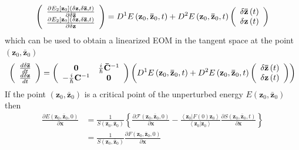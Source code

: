 \documentclass[aps,preprint]{revtex4}%
\begin{document}
\begin{equation}
\left(
\begin{array}
[c]{c}%
\frac{\partial E_{2}\left[  \mathbf{z}_{0}\right]  \left(  \delta
\mathbf{z},\delta\mathbf{\bar{z}},t\right)  }{\partial\delta\mathbf{\bar{z}}%
}\\
\frac{\partial E_{2}\left[  \mathbf{z}_{0}\right]  \left(  \delta
\mathbf{z},\delta\mathbf{\bar{z}},t\right)  }{\partial\delta\mathbf{z}}%
\end{array}
\right)  =D^{1}E\left(  \mathbf{z}_{0},\mathbf{\bar{z}}_{0},t\right)
+D^{2}E\left(  \mathbf{z}_{0},\mathbf{\bar{z}}_{0},t\right)  \left(
\begin{array}
[c]{c}%
\delta\mathbf{\bar{z}}\left(  t\right) \\
\delta\mathbf{z}\left(  t\right)
\end{array}
\right)
\end{equation}
which can be used to obtain a linearized EOM in the tangent space at the point
$\left(  \mathbf{z}_{0},\mathbf{\bar{z}}_{0}\right)  $
\begin{equation}
\left(
\begin{array}
[c]{c}%
\frac{d\delta\mathbf{\bar{z}}}{dt}\\
\frac{d\delta\mathbf{z}}{dt}%
\end{array}
\right)  =\left(
\begin{array}
[c]{cc}%
\mathbf{0} & \frac{i}{\hslash}\mathbf{\bar{C}}^{-1}\\
-\frac{i}{\hslash}\mathbf{C}^{-1} & \mathbf{0}%
\end{array}
\right)  \left(  D^{1}E\left(  \mathbf{z}_{0},\mathbf{\bar{z}}_{0},t\right)
+D^{2}E\left(  \mathbf{z}_{0},\mathbf{\bar{z}}_{0},t\right)  \left(
\begin{array}
[c]{c}%
\delta\mathbf{\bar{z}}\left(  t\right) \\
\delta\mathbf{z}\left(  t\right)
\end{array}
\right)  \right)
\end{equation}
If the point $\left(  \mathbf{z}_{0},\mathbf{\bar{z}}_{0}\right)  $ is a
critical point of the unperturbed energy $E\left(  \mathbf{z}_{0}%
,\mathbf{\bar{z}}_{0}\right)  $ then
\begin{align}
\frac{\partial E\left(  \mathbf{z}_{0},\mathbf{\bar{z}}_{0},0\right)
}{\partial\mathbf{x}}  &  =\frac{1}{S\left(  \mathbf{z}_{0},\mathbf{\bar{z}%
}_{0}\right)  }\left\{  \frac{\partial\mathcal{F}\left(  \mathbf{z}%
_{0},\mathbf{\bar{z}}_{0},0\right)  }{\partial\mathbf{x}}-\frac{\left\langle
\left.  \mathbf{z}_{0}\right\vert F\left(  0\right)  \mathbf{z}_{0}%
\right\rangle }{\left\langle \left.  \mathbf{z}_{0}\right\vert \mathbf{z}%
_{0}\right\rangle }\frac{\partial S\left(  \mathbf{z}_{0},\mathbf{\bar{z}}%
_{0},t\right)  }{\partial\mathbf{x}}\right\} \\
&  =\frac{1}{S\left(  \mathbf{z}_{0},\mathbf{\bar{z}}_{0}\right)  }%
\frac{\partial F\left(  \mathbf{z}_{0},\mathbf{\bar{z}}_{0},0\right)
}{\partial\mathbf{x}}%
\end{align}
\end{document}
